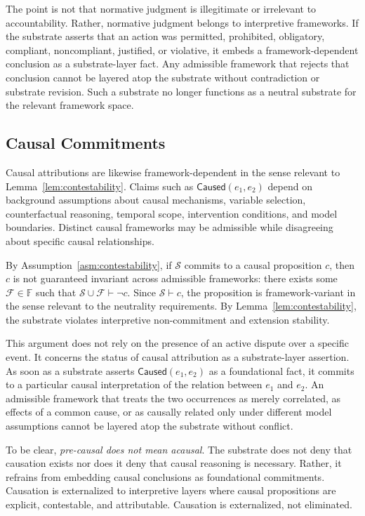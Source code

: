 The point is not that normative judgment is illegitimate
or irrelevant to accountability.
Rather, normative judgment belongs to interpretive frameworks.
If the substrate asserts that an action was permitted, prohibited,
obligatory, compliant, noncompliant, justified, or violative,
it embeds a framework-dependent conclusion
as a substrate-layer fact.
Any admissible framework that rejects that conclusion
cannot be layered atop the substrate without contradiction
or substrate revision.
Such a substrate no longer functions as a neutral substrate
for the relevant framework space.

\subsection{Causal Commitments}
\label{subsec:causal}

Causal attributions are likewise framework-dependent
in the sense relevant to Lemma~\ref{lem:contestability}.
Claims such as $\mathsf{Caused}(e_1,e_2)$
depend on background assumptions about causal mechanisms,
variable selection, counterfactual reasoning,
temporal scope, intervention conditions, and model boundaries.
Distinct causal frameworks may be admissible
while disagreeing about specific causal relationships.

By Assumption~\ref{asm:contestability},
if $\mathcal{S}$ commits to a causal proposition $c$,
then $c$ is not guaranteed invariant across admissible frameworks:
there exists some $\mathcal{F} \in \mathbb{F}$ such that
$\mathcal{S} \cup \mathcal{F} \vdash \neg c$.
Since $\mathcal{S} \vdash c$,
the proposition is framework-variant in the sense relevant
to the neutrality requirements.
By Lemma~\ref{lem:contestability},
the substrate violates
interpretive non-commitment and extension stability.

This argument does not rely on the presence
of an active dispute over a specific event.
It concerns the status of causal attribution
as a substrate-layer assertion.
As soon as a substrate asserts
$\mathsf{Caused}(e_1,e_2)$
as a foundational fact,
it commits to a particular causal interpretation
of the relation between $e_1$ and $e_2$.
An admissible framework that treats the two occurrences
as merely correlated,
as effects of a common cause,
or as causally related only under different model assumptions
cannot be layered atop the substrate without conflict.

To be clear, \textit{pre-causal does not mean acausal}.
The substrate does not deny that causation exists
nor does it deny that causal reasoning is necessary.
Rather, it refrains from embedding causal conclusions
as foundational commitments.
Causation is externalized to interpretive layers
where causal propositions are explicit,
contestable, and attributable.
Causation is externalized, not eliminated.

